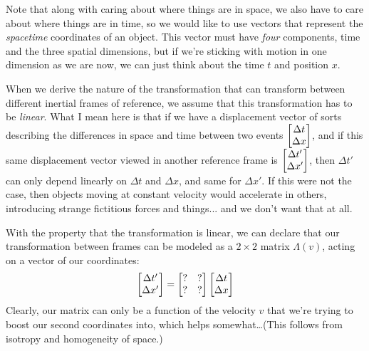 \documentclass[12pt]{scrartcl}
\begin{document}
Note that along with caring about where things are in space, we also have to care about where things are in time, so we would like to use vectors that represent the \textit{spacetime} coordinates of an object. This vector must have \textit{four} components, time and the three spatial dimensions, but if we're sticking with motion in one dimension as we are now, we can just think about the time $t$ and position $x$.

When we derive the nature of the transformation that can transform between different inertial frames of reference, we assume that this transformation has to be \textit{linear}. What I mean here is that if we have a displacement vector of sorts describing the differences in space and time between two events $\begin{bmatrix}\Delta t \\ \Delta x\end{bmatrix}$, and if this same displacement vector viewed in another reference frame is $\begin{bmatrix}\Delta t' \\ \Delta x'\end{bmatrix}$, then $\Delta t'$ can only depend linearly on $\Delta t$ and $\Delta x$, and same for $\Delta x'$. If this were not the case, then objects moving at constant velocity would accelerate in others, introducing strange fictitious forces and things... and we don't want that at all.

With the property that the transformation is linear, we can declare that our transformation between frames can be modeled as a $2 \times 2$ matrix $\Lambda(v)$, acting on a vector of our coordinates:
\[
	\begin{bmatrix}\Delta t' \\ \Delta x'\end{bmatrix} = \begin{bmatrix}? & ? \\ ? & ?\end{bmatrix} \begin{bmatrix}\Delta t \\ \Delta x\end{bmatrix}
\]
Clearly, our matrix can only be a function of the velocity $v$ that we're trying to boost our second coordinates into, which helps somewhat\ldots (This follows from isotropy and homogeneity of space.)
\end{document}
